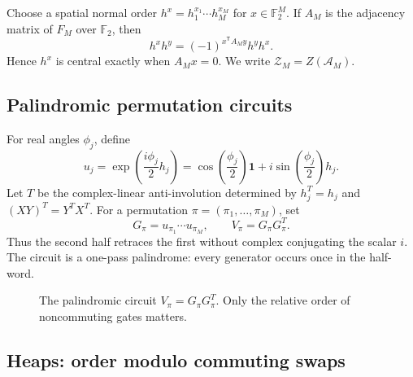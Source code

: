 \documentclass[10pt,letterpaper]{article}
\newcommand{\Aalg}{\mathcal A}
\newcommand{\Zalg}{\mathcal Z}
\newcommand{\FF}{\mathbb F_2}
\newcommand{\one}{\mathbf 1}
\begin{document}
Choose a spatial normal order \(h^x=h_1^{x_1}\cdots h_M^{x_M}\) for \(x\in\FF^M\).  If \(A_M\) is the adjacency matrix of \(F_M\) over \(\FF\), then
\begin{equation}\label{eq:comm-form}
 h^x h^y=(-1)^{x^{\mathsf T}A_My}h^yh^x.
\end{equation}
Hence \(h^x\) is central exactly when \(A_Mx=0\).  We write \(\Zalg_M=Z(\Aalg_M)\).

\subsection{Palindromic permutation circuits}

For real angles \(\phi_j\), define
\begin{equation}\label{eq:gate}
 u_j=\exp\!\left(\frac{i\phi_j}{2}h_j\right)
 =\cos\!\left(\frac{\phi_j}{2}\right)\one
 +i\sin\!\left(\frac{\phi_j}{2}\right)h_j.
\end{equation}
Let \(T\) be the complex-linear anti-involution determined by \(h_j^T=h_j\) and \((XY)^T=Y^TX^T\).  For a permutation \(\pi=(\pi_1,\ldots,\pi_M)\), set
\begin{equation}\label{eq:palindrome}
 G_\pi=u_{\pi_1}\cdots u_{\pi_M},
 \qquad
 V_\pi=G_\pi G_\pi^T.
\end{equation}
Thus the second half retraces the first without complex conjugating the scalar \(i\).  The circuit is a one-pass palindrome: every generator occurs once in the half-word.

\begin{figure}[H]
\centering
{}
\caption{The palindromic circuit \(V_\pi=G_\pi G_\pi^T\).  Only the relative order of noncommuting gates matters.}
\label{fig:palindrome}
\end{figure}

\subsection{Heaps: order modulo commuting swaps}
\end{document}
